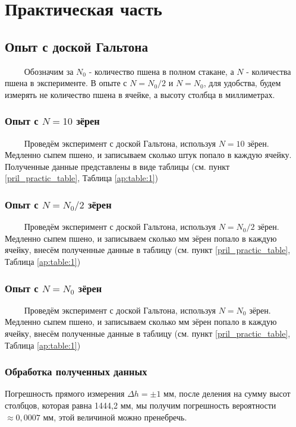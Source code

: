 \section{Практическая часть}



\subsection{Опыт с доской Гальтона}

$\qquad$ Обозначим за $N_0$ - количество пшена в полном стакане, а $N$ - количества пшена в эксперименте. В опыте с $N = N_0 / 2$ и $N = N_0$, для удобства, будем измерять не количество пшена в ячейке, а высоту столбца в миллиметрах.
	
\subsubsection{Опыт с $N = 10$ зёрен}

$\qquad$ Проведём эксперимент с доской Гальтона, используя $N = 10$ зёрен. Медленно сыпем пшено, и записываем сколько штук попало в каждую ячейку. Полученные данные представлены в виде таблицы (см. пункт \ref{pril_practic_table}, Таблица \ref{ap:table:1})

\subsubsection{Опыт с $N = N_0 / 2$ зёрен}

$\qquad$ Проведём эксперимент с доской Гальтона, используя $N = N_0 / 2$ зёрен. Медленно сыпем пшено, и записываем сколько мм зёрен попало в каждую ячейку, внесём полученные данные в таблицу (см. пункт \ref{pril_practic_table}, Таблица \ref{ap:table:1})


\subsubsection{Опыт с $N = N_0$ зёрен} 

$\qquad$ Проведём эксперимент с доской Гальтона, используя $N = N_0$ зёрен. Медленно сыпем пшено, и записываем сколько мм зёрен попало в каждую ячейку, внесём полученные данные в таблицу (см. пункт \ref{pril_practic_table}, Таблица \ref{ap:table:1})

\subsubsection{Обработка полученных данных} \label{obrabotka}
Погрешность прямого измерения $\Delta h = \pm 1 \text{ мм}$, после деления на сумму высот столбцов, которая равна 1444,2 мм, мы получим погрешность вероятности $\approx 0,0007 \text{ мм}$, этой величиной можно пренебречь.

